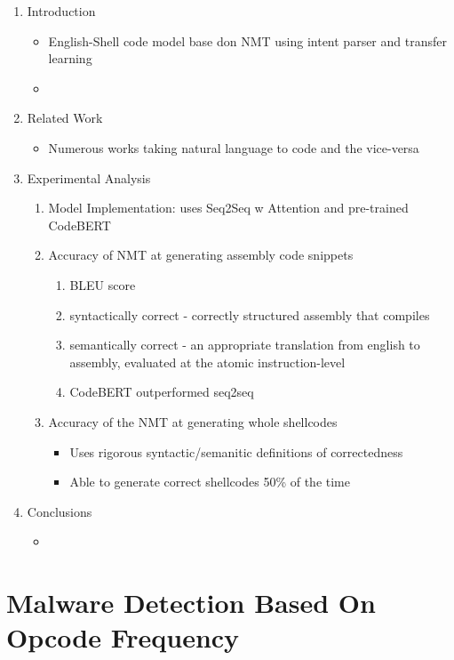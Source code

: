 \documentclass{article}
\begin{document}
\begin{enumerate}
	\item Introduction
	\begin{itemize}
		\item English-Shell code model base don NMT using intent parser and transfer learning
		\item 
	\end{itemize}
	\item Related Work
	\begin{itemize}
		\item Numerous works taking natural language to code and the vice-versa
	\end{itemize}
	\item Experimental Analysis
	\begin{enumerate}
		\item Model Implementation: uses Seq2Seq w Attention and pre-trained CodeBERT
		\item Accuracy of NMT at generating assembly code snippets
		\begin{enumerate}
			\item BLEU score
			\item syntactically correct - correctly structured assembly that compiles
			\item semantically correct - an appropriate translation from english to assembly, evaluated at the atomic instruction-level
			\item CodeBERT outperformed seq2seq
		\end{enumerate}
		\item Accuracy of the NMT at generating whole shellcodes
		\begin{itemize}
			\item Uses rigorous syntactic/semanitic definitions of correctedness
			\item Able to generate correct shellcodes 50\% of the time
		\end{itemize}
	\end{enumerate}
	\item Conclusions
	\begin{itemize}
		\item 
	\end{itemize}
\end{enumerate}

\pagebreak


\section*{Malware Detection Based On Opcode Frequency}
\end{document}
